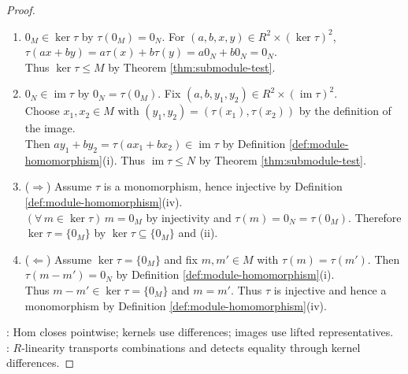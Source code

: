 \begin{proposition}
\begin{proof}
\begin{enumerate}[label=(\roman*)]
\item[$(ii)$] $0_M\in\ker\tau$ by $\tau(0_M)=0_N$. For $(a,b,x,y)\in R^2\times(\ker\tau)^2$, $\tau(ax+by)=a\tau(x)+b\tau(y)=a0_N+b0_N=0_N$.\\
Thus $\ker\tau\leq M$ by Theorem \ref{thm:submodule-test}.
\item[$(iii)$] $0_N\in\operatorname{im}\tau$ by $0_N=\tau(0_M)$. Fix $(a,b,y_1,y_2)\in R^2\times(\operatorname{im}\tau)^2$.\\
Choose $x_1,x_2\in M$ with $(y_1,y_2)=(\tau(x_1),\tau(x_2))$ by the definition of the image.\\
Then $ay_1+by_2=\tau(ax_1+bx_2)\in\operatorname{im}\tau$ by Definition \ref{def:module-homomorphism}(i). Thus $\operatorname{im}\tau\leq N$ by Theorem \ref{thm:submodule-test}.
\item[$(iv)$] ($\Rightarrow$) Assume $\tau$ is a monomorphism, hence injective by Definition \ref{def:module-homomorphism}(iv).\\
$(\forall\,m\in\ker\tau)\,m=0_M$ by injectivity and $\tau(m)=0_N=\tau(0_M)$. Therefore $\ker\tau=\{0_M\}$ by $\ker\tau\subseteq\{0_M\}$ and (ii).
\item[$(iv)$] ($\Leftarrow$) Assume $\ker\tau=\{0_M\}$ and fix $m,m'\in M$ with $\tau(m)=\tau(m')$. Then $\tau(m-m')=0_N$ by Definition \ref{def:module-homomorphism}(i).\\
Thus $m-m'\in\ker\tau=\{0_M\}$ and $m=m'$. Thus $\tau$ is injective and hence a monomorphism by Definition \ref{def:module-homomorphism}(iv).
\end{enumerate}
: Hom closes pointwise; kernels use differences; images use lifted representatives.\\
: $R$-linearity transports combinations and detects equality through kernel differences.
\end{proof}
\end{proposition}

